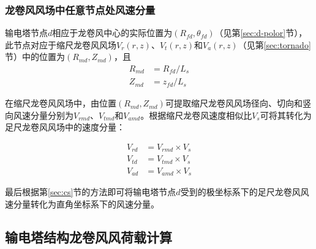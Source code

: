 \subsubsection{龙卷风风场中任意节点处风速分量}
输电塔节点$d$相应于龙卷风中心的实际位置为$(R_{fd}, \theta_{fd})$（见第\ref{sec:d-polor}节），此节点对应于缩尺龙卷风风场$V_r(r,z)$、$V_t(r,z)$和$V_a(r,z)$（见第\ref{sec:tornado}节）中的位置为$(R_{md}, Z_{md})$，且
\begin{equation}
	\begin{split}
		R_{md} & = R_{fd} / L_s \\
		Z_{md} & = z_{fd} / L_s
	\end{split}
\end{equation}

在缩尺龙卷风风场中，由位置$(R_{md}, Z_{md})$可提取缩尺龙卷风风场径向、切向和竖向风速分量分别为$V_{rmd}$、$V_{tmd}$和$V_{amd}$。根据缩尺龙卷风速度相似比$V_s$可将其转化为足尺龙卷风风场中的速度分量：

\begin{equation}
	\begin{split}
		V_{rd} &= V_{rmd} \times V_s \\
		V_{td} &= V_{tmd} \times V_s \\
		V_{ad} &= V_{amd} \times V_s
	\end{split}
\end{equation}

最后根据第\ref{sec:cs}节的方法即可将输电塔节点$d$受到的极坐标系下的足尺龙卷风风速分量转化为直角坐标系下的风速分量。


\subsection{输电塔结构龙卷风风荷载计算}
